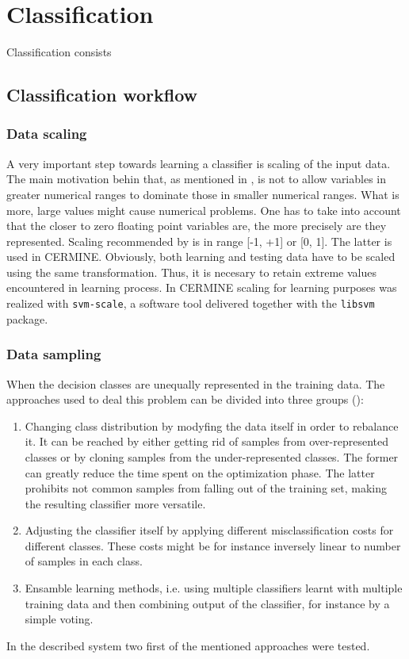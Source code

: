 \chapter{Classification}
Classification consists
\section{Classification workflow}
\subsection{Data scaling}
A very important step towards learning a classifier is scaling of the input data. The main motivation behin that, as mentioned in \cite{Chih-WeiHsu2010}, is not to allow variables in greater numerical ranges to dominate those in smaller numerical ranges. What is more, large values might cause numerical problems. One has to take into account that the closer to zero floating point variables are, the more precisely are they represented. Scaling recommended by \cite{Chih-WeiHsu2010} is in range [-1, +1] or  [0, 1]. The latter is used in CERMINE. Obviously, both learning and testing data have to be scaled using the same transformation. Thus, it is necesary to retain extreme values encountered in learning process.
In CERMINE scaling for learning purposes was realized with \verb+svm-scale+, a software tool delivered together with the \verb+libsvm+ package.
\subsection{Data sampling}
When the decision classes are unequally represented in the training data. The approaches used to deal this problem can be divided into three groups (\cite{Choi}):
\begin{enumerate}
\item Changing class distribution by modyfing the data itself in order to rebalance it. It can be reached by either getting rid of samples from over-represented classes or by cloning samples from the under-represented classes. The former can greatly reduce the time spent on the optimization phase. The latter prohibits not common samples from falling out of the training set, making the resulting classifier more versatile.
\item Adjusting the classifier itself by applying different misclassification costs for different classes. These costs might be for instance inversely linear to number of samples in each class.
\item Ensamble learning methods, i.e. using multiple classifiers learnt with multiple training data and then combining output of the classifier, for instance by a simple voting.
\end{enumerate}
In the described system two first of the mentioned approaches were tested.
